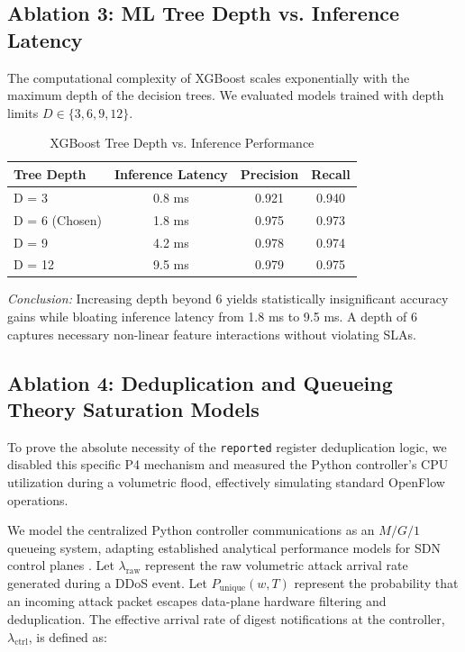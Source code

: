 \documentclass[sigconf, nonacm]{acmart}
\begin{document}
\subsection{Ablation 3: ML Tree Depth vs. Inference Latency}
The computational complexity of XGBoost scales exponentially with the maximum depth of the decision trees. We evaluated models trained with depth limits $D \in \{3, 6, 9, 12\}$.

\begin{table}[h]
\centering
\caption{XGBoost Tree Depth vs. Inference Performance}
\label{tab:ablation_tree}
\begin{tabular}{@{}lccc@{}}
\toprule
\textbf{Tree Depth} & \textbf{Inference Latency} & \textbf{Precision} & \textbf{Recall} \\
\midrule
D = 3 & 0.8 ms & 0.921 & 0.940 \\
D = 6 (Chosen) & 1.8 ms & 0.975 & 0.973 \\
D = 9 & 4.2 ms & 0.978 & 0.974 \\
D = 12 & 9.5 ms & 0.979 & 0.975 \\
\bottomrule
\end{tabular}
\end{table}
\textit{Conclusion:} Increasing depth beyond 6 yields statistically insignificant accuracy gains while bloating inference latency from 1.8 ms to 9.5 ms. A depth of 6 captures necessary non-linear feature interactions without violating SLAs.

\subsection{Ablation 4: Deduplication and Queueing Theory Saturation Models}
To prove the absolute necessity of the \texttt{reported} register deduplication logic, we disabled this specific P4 mechanism and measured the Python controller's CPU utilization during a volumetric flood, effectively simulating standard OpenFlow operations.

We model the centralized Python controller communications as an $M/G/1$ queueing system, adapting established analytical performance models for SDN control planes \cite{zhang2019}. Let $\lambda_{\text{raw}}$ represent the raw volumetric attack arrival rate generated during a DDoS event. Let $P_{\text{unique}}(w, T)$ represent the probability that an incoming attack packet escapes data-plane hardware filtering and deduplication. The effective arrival rate of digest notifications at the controller, $\lambda_{\text{ctrl}}$, is defined as:
\end{document}

